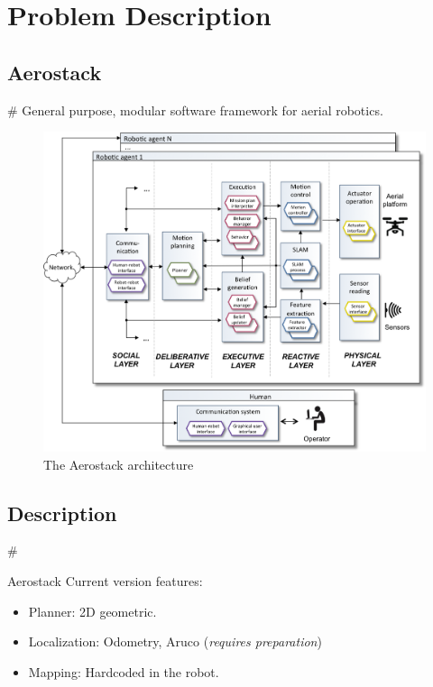 \documentclass[]{beamer}
\def\mAlertSpace{\vspace{0.5em}}
\newcommand{\mSlideTitle}{{{\color{gray}\secname}} \# \subsecname}
\begin{document}
\section{Problem Description}
\subsection{Aerostack}
\begin{frame}{\mSlideTitle}
  General purpose, modular software framework for aerial robotics.
  \begin{figure}[ht]
    \centering
    \includegraphics[height=0.7\textheight]{AerostackArquitecture.png}
    \caption{The Aerostack architecture}
  \end{figure}
\end{frame}

\subsection{Description}
\begin{frame}{\mSlideTitle}
  \begin{alertblock}{Aerostack}
    \mAlertSpace%
    Current version features:
    \begin{itemize}
      \item Planner: 2D geometric.
      \item Localization: Odometry, Aruco (\emph{requires preparation})
      \item Mapping: Hardcoded in the robot.
    \end{itemize}
  \end{alertblock}
\end{frame}
\end{document}
